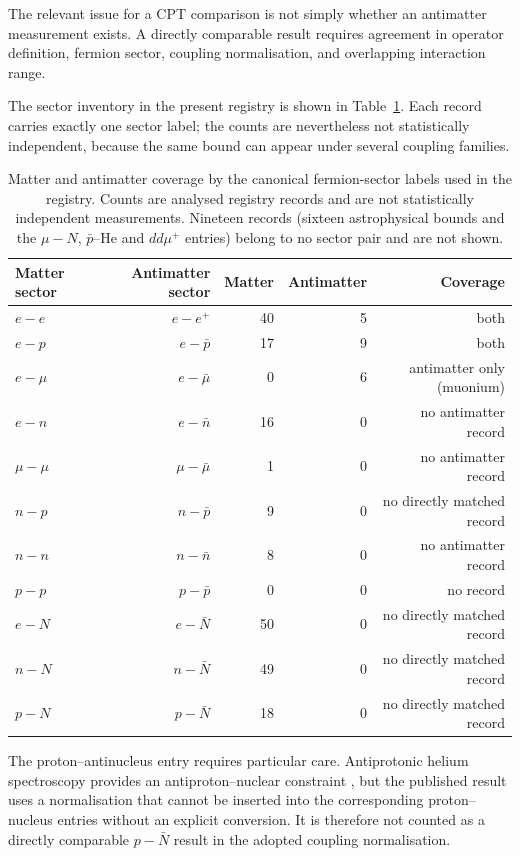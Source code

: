 \documentclass[aps,prd,reprint,superscriptaddress,nofootinbib]{revtex4-2}
\begin{document}
	The relevant issue for a CPT comparison is not simply whether an
	antimatter measurement exists. A directly comparable result requires
	agreement in operator definition, fermion sector, coupling
	normalisation, and overlapping interaction range.
	
	The sector inventory in the present registry is shown in
	Table~\ref{tab:sectorcoverage}. Each record carries exactly one sector label; the counts are nevertheless not statistically independent, because the same bound can appear under several coupling families.
	
	\begin{table}[t]
		\caption{Matter and antimatter coverage by the canonical fermion-sector
			labels used in the registry. Counts are analysed registry records and are not statistically independent measurements. Nineteen records (sixteen astrophysical bounds and the $\mu-N$, $\bar p$--He and $dd\mu^+$ entries) belong to no sector pair and are not shown.}
		\label{tab:sectorcoverage}
		\begin{ruledtabular}
			\begin{tabular}{lrrrr}
				Matter sector & Antimatter sector & Matter & Antimatter
				& Coverage\\
				\hline
				$e-e$ & $e-e^+$ & 40 & 5 & both\\
				$e-p$ & $e-\bar p$ & 17 & 9 & both\\
				$e-\mu$ & $e-\bar\mu$ & 0 & 6 & antimatter only (muonium)\\
				$e-n$ & $e-\bar n$ & 16 & 0 & no antimatter record\\
				$\mu-\mu$ & $\mu-\bar\mu$ & 1 & 0 & no antimatter record\\
				$n-p$ & $n-\bar p$ & 9 & 0 & no directly matched record\\
				$n-n$ & $n-\bar n$ & 8 & 0 & no antimatter record\\
				$p-p$ & $p-\bar p$ & 0 & 0 & no record\\
				$e-N$ & $e-\bar N$ & 50 & 0 & no directly matched record\\
				$n-N$ & $n-\bar N$ & 49 & 0 & no directly matched record\\
				$p-N$ & $p-\bar N$ & 18 & 0 & no directly matched record
			\end{tabular}
		\end{ruledtabular}
	\end{table}
	
	The proton--antinucleus entry requires particular care. Antiprotonic helium spectroscopy provides an antiproton--nuclear constraint \cite{Salumbides2014}, but the published result uses a normalisation that
	cannot be inserted into the corresponding proton--nucleus entries
	without an explicit conversion. It is therefore not counted as a
	directly comparable $p-\bar N$ result in the adopted coupling
	normalisation.
	
\end{document}
